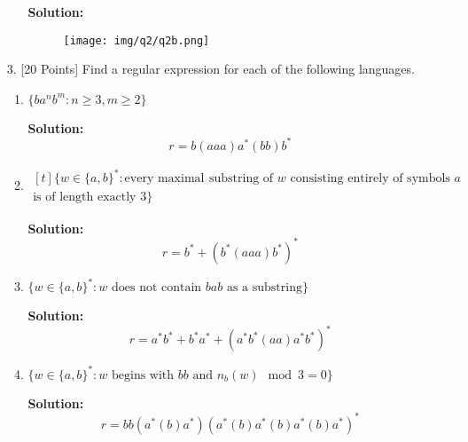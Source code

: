 \documentclass[12pt]{article}
\begin{document}
\begin{spacing}{1.5}
\begin{enumerate}
\begin{enumerate}
                              \textbf{Solution:}

                              \begin{figure}[h!]
                                    \centering
                                    \texttt{[image: img/q2/q2b.png]}
                              \end{figure}
                  \end{enumerate}

                  \newpage
            \item[3.] [20 Points] Find a regular expression for each of the following languages.

                  \begin{enumerate}
                        \item $\{ba^nb^m : n \geq 3, m \geq 2 \}$

                              \textbf{Solution:} $$r = b(aaa)a^*(bb)b^*$$

                        \item
                              $
                                    \begin{aligned}[t]
                                          \{ w \in \{a,b \}^* : \text{every maximal } & \text{substring of } w \text{ consisting entirely of symbols $a$} \\ \text{is of length exactly 3} \}
                                    \end{aligned}
                              $

                              \textbf{Solution:} $$r = b^* + (b^*(aaa)b^*)^*$$

                        \item $\{w \in \{a,b \}^* : w \text{ does not contain $bab$ as a substring} \}$

                              \textbf{Solution:} $$r = a^*b^* + b^*a^* + (a^*b^*(aa)a^*b^*)^*$$

                        \item $\{w \in \{a,b\}^* : w \text{ begins with $bb$ and } n_b(w) \mod 3 = 0 \}$

                              \textbf{Solution:} $$r = bb(a^*(b)a^*)(a^*(b)a^*(b)a^*(b)a^*)^*$$
                  \end{enumerate}

      \end{enumerate}

\end{spacing}
\end{document}
